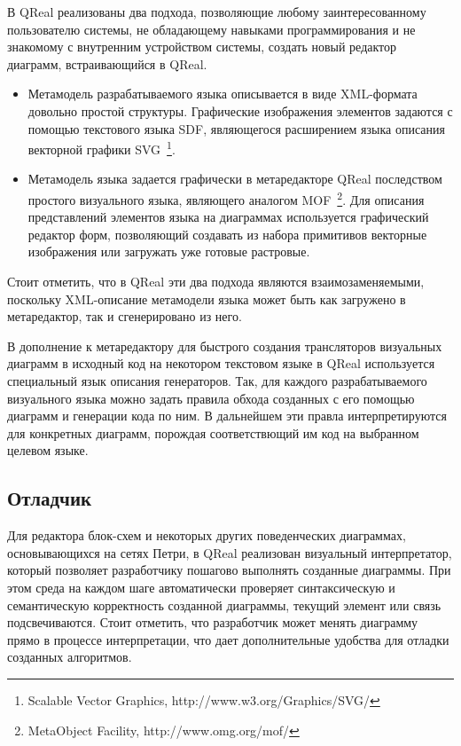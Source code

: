 \documentclass[a4paper]{article}
\begin{document}
В QReal реализованы два подхода, позволяющие любому заинтересованному пользователю системы, не обладающему навыками программирования и не знакомому с внутренним устройством системы, создать новый редактор диаграмм, встраивающийся в QReal.
\begin{itemize}
  \item Метамодель разрабатываемого языка описывается в виде XML-формата довольно простой структуры. Графические изображения элементов задаются с помощью текстового языка SDF, являющегося расширением языка описания векторной графики SVG~\footnote{Scalable Vector Graphics, http://www.w3.org/Graphics/SVG/}.
  \item Метамодель языка задается графически в метаредакторе QReal последством простого визуального языка, являющего аналогом MOF~\footnote{MetaObject Facility, http://www.omg.org/mof/}. Для описания представлений элементов языка на диаграммах используется графический редактор форм, позволяющий создавать из набора примитивов векторные изображения или загружать уже готовые растровые.
\end{itemize}
Стоит отметить, что в QReal эти два подхода являются взаимозаменяемыми, поскольку XML-описание метамодели языка может быть как загружено в метаредактор, так и сгенерировано из него. 

В дополнение к метаредактору для быстрого создания трансляторов визуальных диаграмм в исходный код на некотором текстовом языке в QReal используется специальный язык описания генераторов. Так, для каждого разрабатываемого визуального языка можно задать правила обхода созданных с его помощью диаграмм и генерации кода по ним. В дальнейшем эти правла интерпретируются для конкретных диаграмм, порождая соответствющий им код на выбранном целевом языке.
  
\subsection{Отладчик}

Для редактора блок-схем и некоторых других поведенческих диаграммах, основывающихся на сетях Петри, в QReal реализован визуальный интерпретатор, который позволяет разработчику пошагово выполнять созданные диаграммы. При этом среда на каждом шаге автоматически проверяет синтаксическую и семантическую корректность созданной диаграммы, текущий элемент или связь подсвечиваются. Стоит отметить, что разработчик может менять диаграмму прямо в процессе интерпретации, что дает дополнительные удобства для отладки созданных алгоритмов. 
  
\end{document}

